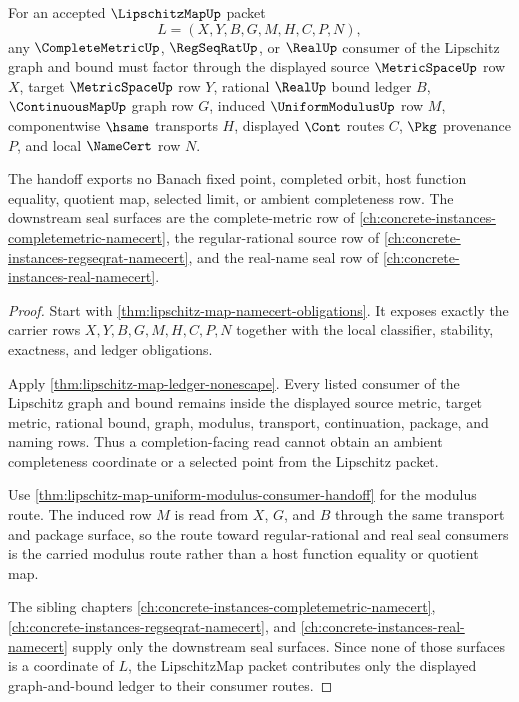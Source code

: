 \begin{theorem}
\label{thm:lipschitzmap-completemetric-regular-seal-boundary}
For an accepted $\LipschitzMapUp$ packet
$$
L=(X,Y,B,G,M,H,C,P,N),
$$
any $\CompleteMetricUp$, $\RegSeqRatUp$, or $\RealUp$ consumer of the
Lipschitz graph and bound must factor through the displayed source
$\MetricSpaceUp$ row $X$, target $\MetricSpaceUp$ row $Y$, rational
$\RealUp$ bound ledger $B$, $\ContinuousMapUp$ graph row $G$, induced
$\UniformModulusUp$ row $M$, componentwise $\hsame$ transports $H$,
displayed $\Cont$ routes $C$, $\Pkg$ provenance $P$, and local $\NameCert$
row $N$.

The handoff exports no Banach fixed point, completed orbit, host function
equality, quotient map, selected limit, or ambient completeness row. The
downstream seal surfaces are the complete-metric row of
\autoref{ch:concrete-instances-completemetric-namecert}, the regular-rational
source row of \autoref{ch:concrete-instances-regseqrat-namecert}, and the
real-name seal row of \autoref{ch:concrete-instances-real-namecert}.
\end{theorem}
\begin{proof}
Start with \autoref{thm:lipschitz-map-namecert-obligations}. It exposes
exactly the carrier rows $X,Y,B,G,M,H,C,P,N$ together with the local
classifier, stability, exactness, and ledger obligations.

Apply \autoref{thm:lipschitz-map-ledger-nonescape}. Every listed consumer of
the Lipschitz graph and bound remains inside the displayed source metric,
target metric, rational bound, graph, modulus, transport, continuation,
package, and naming rows. Thus a completion-facing read cannot obtain an
ambient completeness coordinate or a selected point from the Lipschitz packet.

Use \autoref{thm:lipschitz-map-uniform-modulus-consumer-handoff} for the
modulus route. The induced row $M$ is read from $X$, $G$, and $B$ through the
same transport and package surface, so the route toward regular-rational and
real seal consumers is the carried modulus route rather than a host function
equality or quotient map.

The sibling chapters
\autoref{ch:concrete-instances-completemetric-namecert},
\autoref{ch:concrete-instances-regseqrat-namecert}, and
\autoref{ch:concrete-instances-real-namecert} supply only the downstream seal
surfaces. Since none of those surfaces is a coordinate of $L$, the
LipschitzMap packet contributes only the displayed graph-and-bound ledger to
their consumer routes.
\end{proof}


